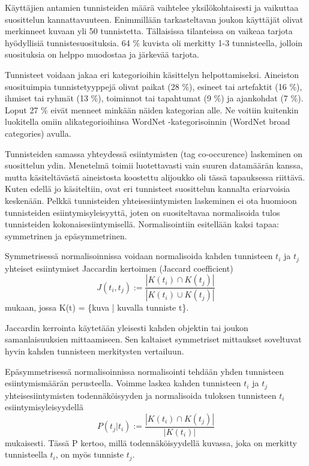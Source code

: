\documentclass[12pt,finnish]{tktltiki2}
\theoremstyle{definition}
\theoremstyle{remark}
\begin{document}
Käyttäjien antamien tunnisteiden määrä vaihtelee yksilökohtaisesti ja vaikuttaa suosittelun kannattavuuteen. Enimmillään tarkasteltavan joukon käyttäjät olivat merkinneet kuvaan yli 50 tunnistetta. Tällaisissa tilanteissa on vaikeaa tarjota hyödyllisiä tunnistesuosituksia. 64 \% kuvista oli merkitty 1-3 tunnisteella, jolloin suosituksia on helppo muodostaa ja järkevää tarjota.

Tunnisteet voidaan jakaa eri kategorioihin käsittelyn helpottamiseksi. Aineiston suosituimpia tunnistetyyppejä olivat paikat (28 \%), esineet tai artefaktit (16 \%), ihmiset tai ryhmät (13 \%), toiminnot tai tapahtumat (9 \%) ja ajankohdat (7 \%). Loput 27 \% eivät menneet minkään näiden kategorian alle. Ne voitiin kuitenkin luokitella omiin alikategorioihinsa WordNet -kategorisoinnin (WordNet broad categories) avulla.

Tunnisteiden samassa yhteydessä esiintymisten (tag co-occurence) laskeminen on suosittelun ydin. Menetelmä toimii luotettavasti vain suuren datamäärän kanssa, mutta käsiteltävästä aineistosta koostettu alijoukko oli tässä tapauksessa riittävä. Kuten edellä jo käsiteltiin, ovat eri tunnisteet suosittelun kannalta eriarvoisia keskenään. Pelkkä tunnisteiden yhteisesiintymisten laskeminen ei ota huomioon tunnisteiden esiintymisyleisyyttä, joten on suositeltavaa normalisoida tulos tunnisteiden kokonaisesiintymisellä. Normalisointiin esitellään kaksi tapaa: symmetrinen ja epäsymmetrinen.

Symmetrisessä normalisoinnissa voidaan normalisoida kahden tunnisteen $t_{i}$ ja $t_{j}$ yhteiset esiintymiset Jaccardin kertoimen (Jaccard coefficient)
\begin{displaymath}
J (t_{i}, t_{j}):= \frac{|K(t_{i}) \cap K(t_{j})|} {|K(t_{i}) \cup K(t_{j})|}
\end{displaymath}
mukaan, jossa K(t) = \{kuva | kuvalla tunniste t\}.

Jaccardin kerrointa käytetään yleisesti kahden objektin tai joukon samanlaisuuksien mittaamiseen. Sen kaltaiset symmetriset mittaukset soveltuvat hyvin kahden tunnisteen merkitysten vertailuun.

Epäsymmetrisessä normalisoinnissa normalisointi tehdään yhden tunnisteen esiintymismäärän perusteella. Voimme laskea kahden tunnisteen $t_{i}$ ja $t_{j}$ yhteisesiintymisten todennäköisyyden ja normalisoida tuloksen tunnisteen $t_{i}$ esiintymisyleisyydellä 
\begin{displaymath}
P (t_{j} | t_{i}):= \frac{|K(t_{i}) \cap K(t_{j})|} {|K(t_{i})|}
\end{displaymath}
mukaisesti. Tässä P kertoo, millä todennäköisyydellä kuvassa, joka on merkitty tunnisteella $t_{i}$, on myös tunniste $t_{j}$.
\end{document}
